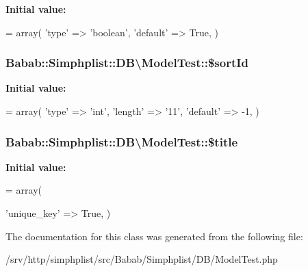 {\bfseries Initial value\+:}
\begin{DoxyCode}
= array(
        \textcolor{stringliteral}{'type'} => \textcolor{stringliteral}{'boolean'},
        \textcolor{stringliteral}{'default'} => True,
    )
\end{DoxyCode}
\hypertarget{classBabab_1_1Simphplist_1_1DB_1_1ModelTest_afe0dd7be959f444f69bf7593c8c64fcd}{
\subsubsection[{\$sort\+Id}]{\setlength{\rightskip}{0pt plus 5cm}Babab\+::\+Simphplist\+::\+D\+B\textbackslash{}\+Model\+Test\+::\$sort\+Id}}\label{classBabab_1_1Simphplist_1_1DB_1_1ModelTest_afe0dd7be959f444f69bf7593c8c64fcd}
{\bfseries Initial value\+:}
\begin{DoxyCode}
= array(
        \textcolor{stringliteral}{'type'} => \textcolor{stringliteral}{'int'},
        \textcolor{stringliteral}{'length'} => \textcolor{stringliteral}{'11'},
        \textcolor{stringliteral}{'default'} => -1,
    )
\end{DoxyCode}
\hypertarget{classBabab_1_1Simphplist_1_1DB_1_1ModelTest_a145f1e9466b264e70af26b16718ad6f1}{
\subsubsection[{\$title}]{\setlength{\rightskip}{0pt plus 5cm}Babab\+::\+Simphplist\+::\+D\+B\textbackslash{}\+Model\+Test\+::\$title}}\label{classBabab_1_1Simphplist_1_1DB_1_1ModelTest_a145f1e9466b264e70af26b16718ad6f1}
{\bfseries Initial value\+:}
\begin{DoxyCode}
= array(
        
        
        \textcolor{stringliteral}{'unique\_key'} => True,
    )
\end{DoxyCode}


The documentation for this class was generated from the following file\+:\begin{DoxyCompactItemize}
\item 
/srv/http/simphplist/src/\+Babab/\+Simphplist/\+D\+B/Model\+Test.\+php\end{DoxyCompactItemize}
